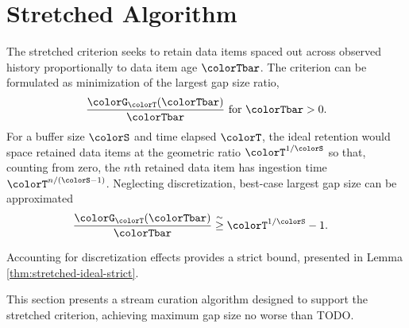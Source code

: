 \section{Stretched Algorithm} \label{sec:stretched}




The stretched criterion seeks to retain data items spaced out across observed history proportionally to data item age $\colorTbar$.
The criterion can be formulated as minimization of the largest gap size ratio,
\begin{align*}
\frac{\colorG_{\colorT}(\colorTbar)}{\colorTbar} \text{ for } \colorTbar > 0.
\end{align*}
For a buffer size $\colorS$ and time elapsed $\colorT$, the ideal retention would space retained data items at the geometric ratio $\colorT^{1/\colorS}$ so that, counting from zero, the $n$th retained data item has ingestion time $\colorT^{n/(\colorS - 1)}$.
Neglecting discretization, best-case largest gap size can be approximated
\begin{align*}
\frac{\colorG_{\colorT}(\colorTbar)}{\colorTbar}
&\stackrel{\sim}{\geq}
\colorT^{1/\colorS} - 1.
\end{align*}

Accounting for discretization effects provides a strict bound, presented in Lemma \ref{thm:stretched-ideal-strict}.



This section presents a stream curation algorithm designed to support the stretched criterion, achieving maximum gap size no worse than TODO.
